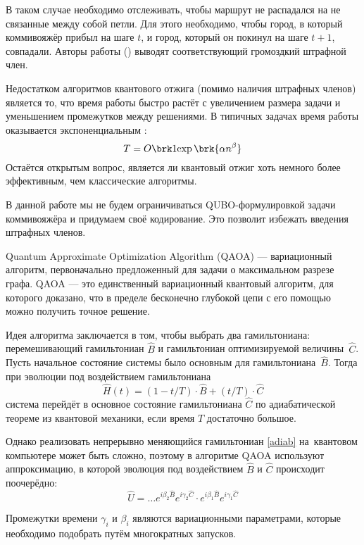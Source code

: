 В таком случае необходимо отслеживать, чтобы маршрут не распадался на не связанные между собой петли.
Для этого необходимо, чтобы город, в который коммивояжёр прибыл на шаге $t$, и город, который он покинул на шаге $t+1$, совпадали. Авторы работы \cite{QUBO-TSP} (\citeyear{QUBO-TSP}) выводят соответствующий громоздкий штрафной член.

Недостатком алгоритмов квантового отжига (помимо наличия штрафных членов) является то, что время работы быстро растёт с увеличением размера задачи и уменьшением промежутков между решениями. В типичных задачах время работы оказывается экспоненциальным \cite{allQUBOs}:
$$
T = O\brk1{\exp\brk{\alpha n ^ \beta}}
$$
Остаётся открытым вопрос, является ли квантовый отжиг хоть немного более эффективным, чем классические алгоритмы.

В данной работе мы не будем ограничиваться QUBO-формулировкой задачи коммивояжёра и придумаем своё кодирование. Это позволит избежать введения штрафных членов.


Quantum Approximate Optimization Algorithm (QAOA) \cite{QAOA} --- вариационный алгоритм, первоначально предложенный для задачи о максимальном разрезе графа. QAOA --- это единственный вариационный квантовый алгоритм, для которого доказано, что в пределе бесконечно глубокой цепи с его помощью можно получить точное решение.

Идея алгоритма заключается в том, чтобы выбрать два гамильтониана: перемешивающий гамильтониан $\hat B$ и гамильтониан оптимизируемой величины~$\hat C$. Пусть начальное состояние системы было основным для гамильтониана~$\hat B$. Тогда при эволюции под воздействием гамильтониана
\begin{equation}
\hat H(t) = (1-t/T) \cdot \hat B + (t/T) \cdot \hat C
\label{adiab}
\end{equation}
система перейдёт в основное состояние гамильтониана $\hat C$ по адиабатической теореме из квантовой механики, если время $T$ достаточно большое.

Однако реализовать непрерывно меняющийся гамильтониан \eqref{adiab} на~квантовом компьютере может быть сложно, поэтому в алгоритме QAOA используют аппроксимацию, в которой эволюция под воздействием $\hat B$ и $\hat C$ происходит поочерёдно:
$$
\hat U = \dots e^{i \beta_2 \hat B} e^{i \gamma_2 \hat C} \cdot e^{i \beta_1 \hat B} e^{i \gamma_1 \hat C}
$$

Промежутки времени $\gamma_i$ и $\beta_i$ являются вариационными параметрами, которые необходимо подобрать путём многократных запусков.

